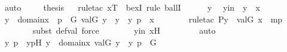 \begin{isabellebody}
\ auto\ \isanewline
\isanewline
\ \ \isamarkupfalse%
\ {\isacharquery}{\kern0pt}thesis\isanewline
\ \ \isamarkupfalse%
{\isacharparenleft}{\kern0pt}rule{\isacharunderscore}{\kern0pt}tac\ x{\isacharequal}{\kern0pt}T\ \ bexI{\isacharcomma}{\kern0pt}\ rule\ ballI{\isacharparenright}{\kern0pt}\isanewline
\ \ \ \ \isamarkupfalse%
\ y\ \isamarkupfalse%
\ yin\ {\isacharcolon}{\kern0pt}\ {\isachardoublequoteopen}y\ {\isasymin}\ x{\isachardoublequoteclose}\ \isanewline
\ \ \ \ \isamarkupfalse%
\ {\isachardoublequoteopen}{\isasymexists}y{\isacharprime}{\kern0pt}\ {\isasymin}\ domain{\isacharparenleft}{\kern0pt}x{\isacharprime}{\kern0pt}{\isacharparenright}{\kern0pt}\ {\isachardot}{\kern0pt}\ {\isasymexists}p\ {\isasymin}\ G{\isachardot}{\kern0pt}\ val{\isacharparenleft}{\kern0pt}G{\isacharcomma}{\kern0pt}\ y{\isacharprime}{\kern0pt}{\isacharparenright}{\kern0pt}\ {\isacharequal}{\kern0pt}\ y\ {\isasymand}\ {\isacharless}{\kern0pt}y{\isacharprime}{\kern0pt}{\isacharcomma}{\kern0pt}\ p{\isachargreater}{\kern0pt}\ {\isasymin}\ x{\isacharprime}{\kern0pt}{\isachardoublequoteclose}\ \isanewline
\ \ \ \ \ \ \isamarkupfalse%
{\isacharparenleft}{\kern0pt}rule{\isacharunderscore}{\kern0pt}tac\ P{\isacharequal}{\kern0pt}{\isachardoublequoteopen}y\ {\isasymin}\ val{\isacharparenleft}{\kern0pt}G{\isacharcomma}{\kern0pt}\ x{\isacharprime}{\kern0pt}{\isacharparenright}{\kern0pt}{\isachardoublequoteclose}\ \ mp{\isacharparenright}{\kern0pt}\isanewline
\ \ \ \ \ \ \ \isamarkupfalse%
{\isacharparenleft}{\kern0pt}subst\ def{\isacharunderscore}{\kern0pt}val{\isacharcomma}{\kern0pt}\ force{\isacharparenright}{\kern0pt}\isanewline
\ \ \ \ \ \ \isamarkupfalse%
\ yin\ x{\isacharprime}{\kern0pt}H\ \isanewline
\ \ \ \ \ \ \isamarkupfalse%
\ auto\isanewline
\ \ \ \ \isamarkupfalse%
\ \isamarkupfalse%
\ y{\isacharprime}{\kern0pt}\ p\ \ y{\isacharprime}{\kern0pt}pH{\isacharcolon}{\kern0pt}\ {\isachardoublequoteopen}y{\isacharprime}{\kern0pt}\ {\isasymin}\ domain{\isacharparenleft}{\kern0pt}x{\isacharprime}{\kern0pt}{\isacharparenright}{\kern0pt}{\isachardoublequoteclose}\ {\isachardoublequoteopen}val{\isacharparenleft}{\kern0pt}G{\isacharcomma}{\kern0pt}\ y{\isacharprime}{\kern0pt}{\isacharparenright}{\kern0pt}\ {\isacharequal}{\kern0pt}\ y{\isachardoublequoteclose}\ {\isachardoublequoteopen}p\ {\isasymin}\ G{\isachardoublequoteclose}\ \isamarkupfalse%

\end{isabellebody}
